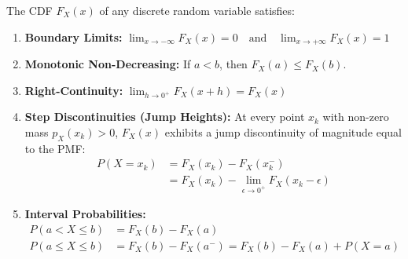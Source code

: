 \documentclass[12pt,a4paper]{article}
\begin{document}
\begin{tcolorbox}[formulabox, title={\textbf{Mathematical Properties of the Discrete CDF}}]
The CDF $F_X(x)$ of any discrete random variable satisfies:
\begin{enumerate}[leftmargin=*, itemsep=3pt]
  \item \textbf{Boundary Limits:} $\displaystyle\lim_{x \to -\infty} F_X(x) = 0 \quad \text{and} \quad \lim_{x \to +\infty} F_X(x) = 1$
  \item \textbf{Monotonic Non-Decreasing:} If $a < b$, then $F_X(a) \le F_X(b)$.
  \item \textbf{Right-Continuity:} $\displaystyle\lim_{h \to 0^+} F_X(x + h) = F_X(x)$
  \item \textbf{Step Discontinuities (Jump Heights):} At every point $x_k$ with non-zero mass $p_X(x_k) > 0$, $F_X(x)$ exhibits a jump discontinuity of magnitude equal to the PMF:
  \begin{equation}
    \begin{aligned}
      P(X = x_k) &= F_X(x_k) - F_X(x_k^-) \\[3pt]
      &= F_X(x_k) - \lim_{\epsilon \to 0^+} F_X(x_k - \epsilon)
    \end{aligned}
  \end{equation}
  \item \textbf{Interval Probabilities:}
  \begin{align}
    P(a < X \le b) &= F_X(b) - F_X(a) \\[2pt]
    P(a \le X \le b) &= F_X(b) - F_X(a^-) = F_X(b) - F_X(a) + P(X = a)
  \end{align}
\end{enumerate}
\end{tcolorbox}
\end{document}
